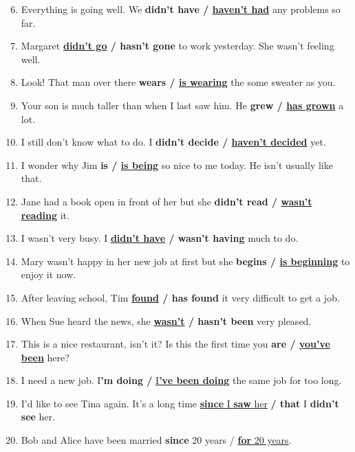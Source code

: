 \documentclass[main.tex]{subfiles}
\begin{document}
\begin{enumerate}[nosep,leftmargin=*]
	\setcounter{enumi}{5}
	\item Everything is going well. We \textbf{didn't have / \underline{haven't had}} any problems so far.
	\item Margaret \textbf{\underline{didn't go} / hasn't gone} to work yesterday. She wasn't feeling well.
	\item Look! That man over there \textbf{wears / \underline{is wearing}} the some sweater as you.
	\item Your son is much taller than when I last saw him. He \textbf{grew / \underline{has grown}} a lot.
	\item I still don't know what to do. I \textbf{didn't decide / \underline{haven't decided}} yet.
	\item I wonder why Jim \textbf{is / \underline{is being}} so nice to me today. He isn't usually like that.
	\item Jane had a book open in front of her but she \textbf{didn't read / \underline{wasn't reading}} it.
	\item I wasn't very busy. I \textbf{\underline{didn't have} / wasn't having} much to do.
	\item Mary wasn't happy in her new job at first but she \textbf{begins / \underline{is beginning}} to enjoy it now.
	\item After leaving school, Tim \textbf{\underline{found} / has found} it very difficult to get a job.
	\item When Sue heard the news, she \textbf{\underline{wasn't} / hasn't been} very pleased.
	\item This is a nice restaurant, isn't it? Is this the first time you \textbf{are / \underline{you've been}} here?
	\item I need a new job. I\textbf{'m doing /} \underline{I\textbf{'ve been doing}} the same job for too long.
	\item I'd like to see Tina again. It's a long time \underline{\textbf{since} I \textbf{saw} her} \textbf{/ that} I \textbf{didn't see} her.
	\item Bob and Alice have been married \textbf{since} 20 years / \underline{\textbf{for} 20 years}.
\end{enumerate}
\end{document}
